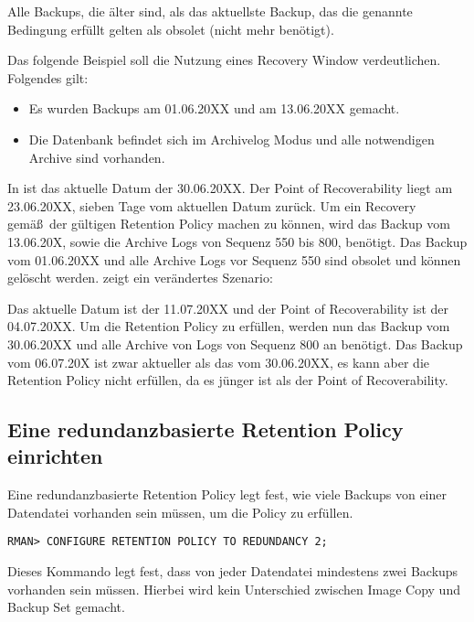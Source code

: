         Alle Backups, die \"alter sind, als das aktuellste Backup, das die genannte Bedingung erf\"ullt gelten als obsolet (nicht mehr ben\"otigt).

        Das folgende Beispiel soll die Nutzung eines Recovery Window verdeutlichen. Folgendes gilt:
        \begin{itemize}
          \item Es wurden Backups am 01.06.20XX und am 13.06.20XX gemacht.
          \item Die Datenbank befindet sich im Archivelog Modus und alle notwendigen Archive sind vorhanden.
        \end{itemize}
        In  ist das aktuelle Datum der 30.06.20XX. Der Point of Recoverability liegt am 23.06.20XX, sieben Tage vom aktuellen Datum zur\"uck. Um ein Recovery gem\"a\ss{}\ der g\"ultigen Retention Policy machen zu k\"onnen, wird das Backup vom 13.06.20X, sowie die Archive Logs von Sequenz 550 bis 800, ben\"otigt. Das Backup vom 01.06.20XX und alle Archive Logs vor Sequenz 550 sind obsolet und k\"onnen gel\"oscht werden.
\clearpage
         zeigt ein ver\"andertes Szenario:


        Das aktuelle Datum ist der 11.07.20XX und der Point of Recoverability ist der 04.07.20XX. Um die Retention Policy zu erf\"ullen, werden nun das Backup vom 30.06.20XX und alle Archive von Logs von Sequenz 800 an ben\"otigt. Das Backup vom 06.07.20X ist zwar aktueller als das vom 30.06.20XX, es kann aber die Retention Policy nicht erf\"ullen, da es j\"unger ist als der Point of Recoverability.
      \subsection{Eine redundanzbasierte Retention Policy einrichten}
        Eine redundanzbasierte Retention Policy legt fest, wie viele Backups von einer Datendatei vorhanden sein m\"ussen, um die Policy zu erf\"ullen.
        \begin{lstlisting}[caption={REDUNDANCY setzen},label=admin1026,language=rman]
RMAN> CONFIGURE RETENTION POLICY TO REDUNDANCY 2;
        \end{lstlisting}
        Dieses Kommando legt fest, dass von jeder Datendatei mindestens zwei Backups vorhanden sein m\"ussen. Hierbei wird kein Unterschied zwischen Image Copy und Backup Set gemacht.

